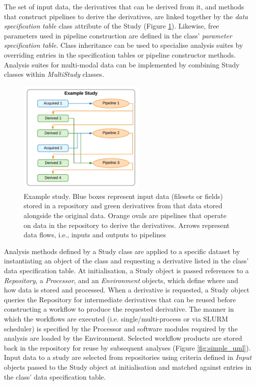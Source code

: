 \documentclass[smallextended]{svjour3}       %
\begin{document}
The set of input data, the derivatives that can be derived from it,
and methods that construct pipelines to derive the derivatives, are
linked together by the \emph{data specification} \emph{table} class
attribute of the Study (Figure \ref{fig:example_study}). Likewise,
free parameters used in pipeline construction are defined in the class'
\emph{parameter specification} \emph{table}. Class inheritance can
be used to specialise analysis suites by overriding entries in the
specification tables or pipeline constructor methods. Analysis suites
for multi-modal data can be implemented by combining Study classes
within \emph{MultiStudy} classes\emph{.}

\begin{figure}
    \centering
    \includegraphics[width=0.55\textwidth]{../figures/example_study}
  \caption{Example study. Blue boxes represent input
data (filesets or fields) stored in a repository and green derivatives
from that data stored alongside the original data. Orange ovals are
pipelines that operate on data in the repository to derive the
derivatives. Arrows represent data flows, i.e., inputs and outputs to
pipelines}
\label{fig:example_study}
\end{figure}

Analysis methods defined by a Study class are applied to a
specific dataset by instantiating an object of the class and
requesting a derivative listed in the class' data specification table.
At initialisation, a Study object is passed references to a \emph{Repository},
a \emph{Processor}, and an \emph{Environment} objects, which
define where and how data is stored and processed. When a derivative is
requested, a Study object queries the Repository for intermediate
derivatives that can be reused before constructing a workflow to produce
the requested derivative. The manner in which the workflows are executed
(i.e. single/multi-process or via SLURM scheduler) is specified by the
Processor and software modules required by the analysis are
loaded by the Environment. Selected workflow products are
stored back in the repository for reuse by subsequent analyses (Figure
\ref{fig:simple_uml}). Input data to a study are selected from repositories
 using criteria defined in \emph{Input} objects passed to the Study
 object at initialisation and matched against entries in the class' data
specification table.
\end{document}
